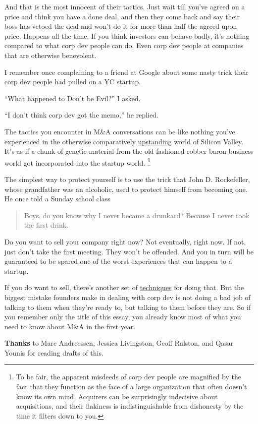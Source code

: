 And that is the most innocent of their tactics. Just wait till you've
agreed on a price and think you have a done deal, and then they come
back and say their boss has vetoed the deal and won't do it for more
than half the agreed upon price. Happens all the time. If you think
investors can behave badly, it's nothing compared to what corp dev
people can do. Even corp dev people at companies that are otherwise
benevolent.

I remember once complaining to a friend at Google about some nasty trick
their corp dev people had pulled on a YC startup.

``What happened to Don't be Evil?'' I asked.

``I don't think corp dev got the memo,'' he replied.

The tactics you encounter in M\&A conversations can be like nothing
you've experienced in the otherwise comparatively
\href{mean.html}{upstanding} world of Silicon Valley. It's as if a chunk
of genetic material from the old-fashioned robber baron business world
got incorporated into the startup world. \footnote{To be fair, the apparent misdeeds of corp dev people are
magnified by the fact that they function as the face of a large
organization that often doesn't know its own mind. Acquirers can be
surprisingly indecisive about acquisitions, and their flakiness is
indistinguishable from dishonesty by the time it filters down to you.}

The simplest way to protect yourself is to use the trick that John D.
Rockefeller, whose grandfather was an alcoholic, used to protect himself
from becoming one. He once told a Sunday school class

\begin{quote}
Boys, do you know why I never became a drunkard? Because I never took
the first drink.
\end{quote}

Do you want to sell your company right now? Not eventually, right now.
If not, just don't take the first meeting. They won't be offended. And
you in turn will be guaranteed to be spared one of the worst experiences
that can happen to a startup.

If you do want to sell, there's another set of
\href{https://justinkan.com/the-founders-guide-to-selling-your-company-a1b2025c9481}{techniques}
for doing that. But the biggest mistake founders make in dealing with
corp dev is not doing a bad job of talking to them when they're ready
to, but talking to them before they are. So if you remember only the
title of this essay, you already know most of what you need to know
about M\&A in the first year.


\textbf{Thanks} to Marc Andreessen, Jessica Livingston, Geoff Ralston,
and Qasar Younis for reading drafts of this.